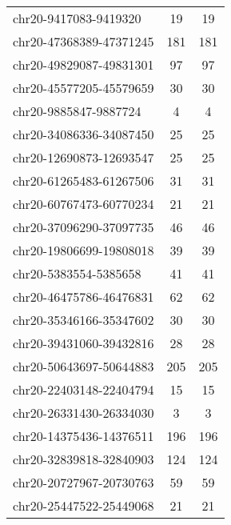 \begin{longtable}{lSS}
	chr20-9417083-9419320   & 19     & 19                                        \\
	chr20-47368389-47371245 & 181    & 181                                       \\
	chr20-49829087-49831301 & 97     & 97                                        \\
	chr20-45577205-45579659 & 30     & 30                                        \\
	chr20-9885847-9887724   & 4      & 4                                         \\
	chr20-34086336-34087450 & 25     & 25                                        \\
	chr20-12690873-12693547 & 25     & 25                                        \\
	chr20-61265483-61267506 & 31     & 31                                        \\
	chr20-60767473-60770234 & 21     & 21                                        \\
	chr20-37096290-37097735 & 46     & 46                                        \\
	chr20-19806699-19808018 & 39     & 39                                        \\
	chr20-5383554-5385658   & 41     & 41                                        \\
	chr20-46475786-46476831 & 62     & 62                                        \\
	chr20-35346166-35347602 & 30     & 30                                        \\
	chr20-39431060-39432816 & 28     & 28                                        \\
	chr20-50643697-50644883 & 205    & 205                                       \\
	chr20-22403148-22404794 & 15     & 15                                        \\
	chr20-26331430-26334030 & 3      & 3                                         \\
	chr20-14375436-14376511 & 196    & 196                                       \\
	chr20-32839818-32840903 & 124    & 124                                       \\
	chr20-20727967-20730763 & 59     & 59                                        \\
	chr20-25447522-25449068 & 21     & 21                                        \\

\end{longtable}
